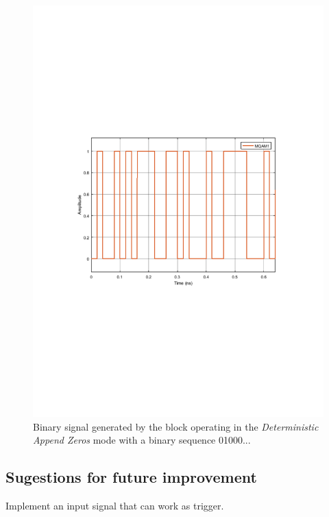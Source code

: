 \begin{figure}
	\centering
	\includegraphics[clip, trim=0.5cm 9cm 0.5cm 9cm, width=\textwidth]{./lib/binary_source/figures/BinarySource_output.pdf}
	
	\caption{Binary signal generated by the block operating in the \textit{Deterministic Append Zeros} mode with a binary sequence 01000...}\label{MQAM1_DeterministAppendZeros}
\end{figure}

\subsection*{Sugestions for future improvement}

Implement an input signal that can work as trigger.

